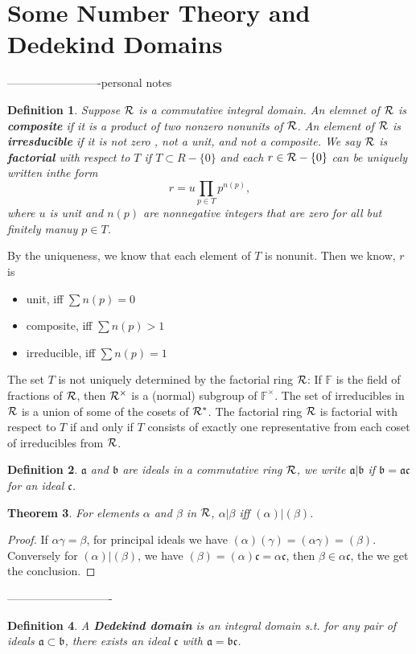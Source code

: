 \documentclass[11pt]{article}
\newtheorem{thm}{Theorem}[section]
\newtheorem{dfn}[thm]{Definition}
\newcommand{\bbf}{\mathbb F}
\newcommand{\sca}{{\mathfrak a}}
\newcommand{\scb}{{\mathfrak b}}
\newcommand{\scc}{{\mathfrak c}}
\newcommand{\calr}{{\cal R}}
\begin{document}
\section*{Some Number Theory and Dedekind Domains}
-------------------------personal notes
\begin{dfn}
Suppose $\calr$ is a commutative integral domain. An elemnet of $\calr $ is \textbf{composite} if it is a product of two nonzero nonunits of $\calr$. An element of $\calr$ is \textbf{irresducible} if it  is not zero , not a unit, and not a composite. We say $\calr$ is \textbf{factorial} with respect to $T$ if $T\subset R-\{0\}$ and each $r\in \calr-\{0\}$ can be uniquely written inthe form 
$$
r=u\prod_{p\in T} p^{n(p)},
$$
where $u$ is unit and $n(p)$ are nonnegative integers that are zero for all but finitely manuy $p\in T$.
\end{dfn}
By the uniqueness, we know that each element of $T$ is nonunit. Then we know, $r$ is 
\begin{itemize}
\item unit, iff $\sum n(p)=0$
\item composite, iff $\sum n(p)>1$
\item irreducible, iff $\sum n(p)=1$
\end{itemize}
The set $T$ is not uniquely determined by the factorial ring $\calr$: If $\bbf$ is the field of fractions of $\calr$, then $\calr^\times$ is a (normal) subgroup of $\bbf^\times$. The set of irreducibles in $\calr$ is a union of some of the cosets of $\calr^*$. The factorial ring $\calr$ is factorial with respect to $T$ if and only if $T$ consists of exactly one representative from each coset of irreducibles from $\calr$.
\begin{dfn}
$\sca$ and $\scb$  are ideals in a commutative ring $\calr$, we write $\sca|\scb$ if $\scb=\sca \scc$ for an ideal $\scc$.
\end{dfn}

\begin{thm}
For elements $\alpha$ and $\beta$ in $\calr$, $\alpha|\beta$ iff $(\alpha)|(\beta)$.
\end{thm}
\begin{proof}
If $\alpha\gamma=\beta$, for principal ideals we have $(\alpha)(\gamma)=(\alpha\gamma)=(\beta)$. Conversely for $(\alpha)|(\beta)$, we have $(\beta)=(\alpha)\scc=\alpha\scc$, then $\beta\in \alpha\scc$, the we get the conclusion.
\end{proof}
----------------------------
\begin{dfn}
A \textbf{Dedekind domain} is an integral domain s.t. for any pair of ideals $\sca\subset\scb$, there exists an ideal $\scc$ with $\sca=\scb\scc$.
\end{dfn}
\end{document}
